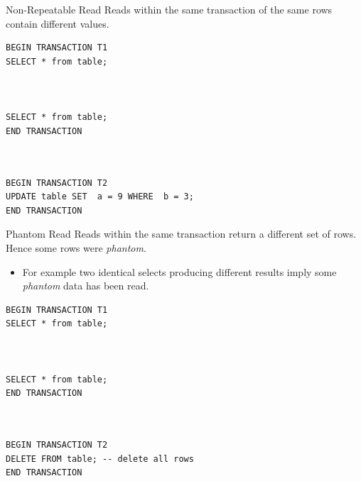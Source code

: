 \begin{definitionbox}{Non-Repeatable Read}
    Reads within the same transaction of the same rows contain different values.
    \tcblower
    \begin{minipage}[t]{.49\textwidth}
        \begin{verbatim}
BEGIN TRANSACTION T1
SELECT * from table;



SELECT * from table;
END TRANSACTION
       \end{verbatim}
   \end{minipage} \hfill \begin{minipage}[t]{.49\textwidth}
       \begin{verbatim}


BEGIN TRANSACTION T2
UPDATE table SET  a = 9 WHERE  b = 3;
END TRANSACTION

       \end{verbatim}
   \end{minipage}
\end{definitionbox}

\begin{definitionbox}{Phantom Read}
    Reads within the same transaction return a different set of rows. Hence some rows were \textit{phantom}.
    \begin{itemize}
        \item For example two identical selects producing different results imply some \textit{phantom} data has been read.
    \end{itemize}
    \tcblower
    \begin{minipage}[t]{.49\textwidth}
        \begin{verbatim}
BEGIN TRANSACTION T1
SELECT * from table;



SELECT * from table;
END TRANSACTION
       \end{verbatim}
   \end{minipage} \hfill \begin{minipage}[t]{.49\textwidth}
       \begin{verbatim}


BEGIN TRANSACTION T2
DELETE FROM table; -- delete all rows
END TRANSACTION

       \end{verbatim}
   \end{minipage}
\end{definitionbox}


